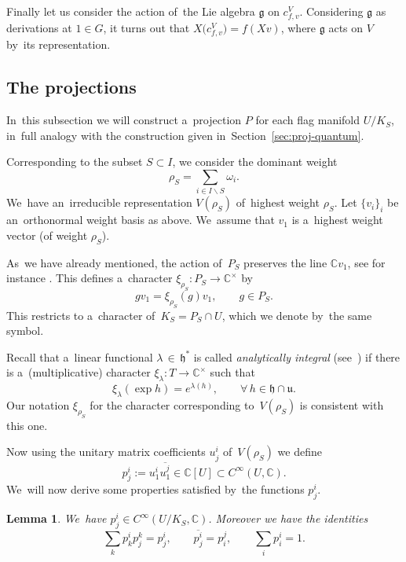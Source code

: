 \documentclass[10pt,a4paper]{amsart}
\numberwithin{equation}{section}
\newtheorem{Lemma}[Theorem]{Lemma}
\newcommand{\lieg}{\mathfrak{g}}
\newcommand{\lieh}{\mathfrak{h}}
\newcommand{\lieu}{\mathfrak{u}}
\newcommand{\CU}{\mathbb{C}[U]}
\newcommand{\bbC}{\mathbb{C}}
\newcommand{\weiS}{\rho_S}
\newcommand{\charS}{\xi_{\weiS}}
\begin{document}
Finally let us consider the action of~the Lie algebra $\lieg$ on $c^V_{f, v}$.
Considering $\lieg$ as derivations at $1 \in G$, it turns out that $X\big(c^V_{f, v}\big) = f(X v)$, where $\lieg$ acts on $V$ by~its representation.

\subsection{The projections}

In~this subsection we will construct a~projection $P$ for each flag manifold $U / K_S$, in~full analogy with the construction given in~Section~\ref{sec:proj-quantum}.

Corresponding to the subset $S \subset I$, we consider the dominant weight
\[
\rho_S = \sum_{i \in I \backslash S} \omega_i.
\]
We~have an~irreducible representation $V(\rho_S)$ of~highest weight $\rho_S$.
Let $\{v_i\}_i$ be an~orthonormal weight basis as above.
We~assume that $v_1$ is a~highest weight vector (of weight $\rho_S$).

As~we have already mentioned, the action of~$P_S$ preserves the line $\bbC v_1$, see for instance \mbox{\cite[Section~3.2.8]{cap-book}}.
This defines a~character $\charS\colon P_S \to \bbC^\times$ by
\[
g v_1 = \charS(g) v_1, \qquad g \in P_S.
\]
This restricts to a~character of~$K_S = P_S \cap U$, which we denote by~the same symbol.

\begin{Remark}
Recall that a~linear functional $\lambda\, {\in}\, \lieh^*$ is called \emph{analytically integral} (see~\cite[Sec\-tion~IV.7]{knapp}) if there is a~(multiplicative) character $\xi_\lambda\colon T \to \bbC^\times$ such that
\[
\xi_\lambda(\exp h) = e^{\lambda(h)}, \qquad \forall\, h \in \lieh \cap \lieu.
\]
Our notation $\charS$ for the character corresponding to~$V(\rho_S)$ is consistent with this one.
\end{Remark}

Now using the unitary matrix coefficients $u^i_j$ of~$V(\rho_S)$ we define
\begin{equation}
\label{eq:class-proj}
p^i_j := u^i_1 \overline{u^j_1} \in \CU \subset C^\infty(U, \bbC).
\end{equation}
We~will now derive some properties satisfied by~the functions $p^i_j$.

\begin{Lemma}
\label{lem:proj-mat}
We~have $p^i_j \in C^\infty(U / K_S, \bbC)$. Moreover we have the identities
\[
\sum_k p^i_k p^k_j = p^i_j, \qquad
\overline{p^i_j} = p^j_i, \qquad
\sum_i p^i_i = 1.
\]
\end{Lemma}
\end{document}
